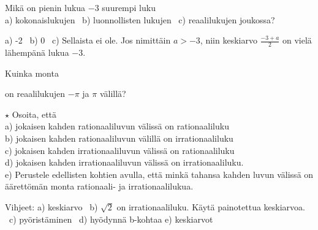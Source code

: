 \begin{tehtavasivu}
\begin{tehtava}%
\begin{alakohdat}
\end{alakohdat}
\begin{vastaus}
\begin{alakohdat}
\end{alakohdat}
\end{vastaus}
\end{tehtava}


\begin{tehtava}
Mikä on pienin lukua $-3$ suurempi luku \\
a) kokonaislukujen \ b) luonnollisten lukujen \ c) reaalilukujen joukossa?
\begin{vastaus}
a) -2 \ b) 0 \ c) Sellaista ei ole. Jos nimittäin $a > -3$, niin keskiarvo
$\frac{-3+a}{2}$ on vielä lähempänä lukua $-3$. 
\end{vastaus}
\end{tehtava}

\begin{tehtava}
Kuinka monta 
\begin{alakohdat}
\end{alakohdat}
on reaalilukujen \(-\pi\) ja \(\pi\) välillä?
\begin{vastaus}
\begin{alakohdat}
\end{alakohdat}
\end{vastaus}
\end{tehtava}

\begin{tehtava}
$\star$ Osoita, että \\
a) jokaisen kahden rationaaliluvun välissä on rationaaliluku \\
b) jokaisen kahden rationaaliluvun välillä on irrationaaliluku \\
c) jokaisen kahden irrationaaliluvun välissä on rationaaliluku \\
d) jokaisen kahden irrationaaliluvun välissä on irrationaaliluku. \\
e) Perustele edellisten kohtien avulla, että minkä tahansa kahden luvun
välissä on äärettömän monta rationaali- ja irrationaalilukua.
\begin{vastaus}
Vihjeet: a) keskiarvo \ b) $\sqrt{2}$ on irrationaaliluku. Käytä
painotettua keskiarvoa. \ c) pyöristäminen \ d) hyödynnä b-kohtaa
e) keskiarvot
\end{vastaus}
\end{tehtava}

\end{tehtavasivu}
